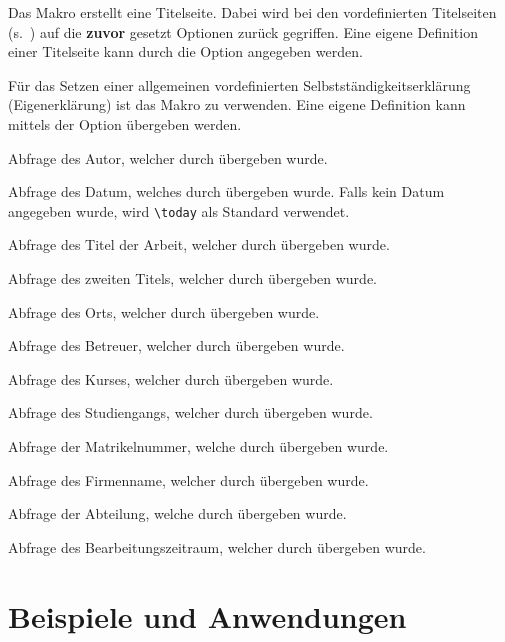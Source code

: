 \documentclass[babel=ngerman,highlight=false]{skdoc}
\begin{document}
            \DescribeMacro\dhbwtitlepage Das Makro erstellt eine Titelseite. Dabei wird bei den vordefinierten Titelseiten (s.~) auf die \textbf{zuvor} gesetzt Optionen zurück gegriffen. Eine eigene Definition einer Titelseite kann durch die Option  angegeben werden.

            \DescribeMacro\dhbwdeclaration Für das Setzen einer allgemeinen vordefinierten Selbstständigkeitserklärung (Eigenerklärung) ist das Makro zu verwenden. Eine eigene Definition kann mittels der Option  übergeben werden.

            \DescribeMacro\getAuthor Abfrage des Autor, welcher durch  übergeben wurde.

            \DescribeMacro\getDate Abfrage des Datum, welches durch  übergeben wurde. Falls kein Datum angegeben wurde, wird \verb|\today| als Standard verwendet.

            \DescribeMacro\getThesisTitle Abfrage des Titel der Arbeit, welcher durch  übergeben wurde.

            \DescribeMacro\getThesisSecondTitle Abfrage des zweiten Titels, welcher durch  übergeben wurde.

            \DescribeMacro\getLocation Abfrage des Orts, welcher durch  übergeben wurde.

            \DescribeMacro\getSupervisor Abfrage des Betreuer, welcher durch  übergeben wurde.

            \DescribeMacro\getCourseId Abfrage des Kurses, welcher durch  übergeben wurde.

            \DescribeMacro\getCourseName Abfrage des Studiengangs, welcher durch  übergeben wurde.

            \DescribeMacro\getStudentId Abfrage der Matrikelnummer, welche durch  übergeben wurde.

            \DescribeMacro\getInstitute Abfrage des Firmenname, welcher durch  übergeben wurde.

            \DescribeMacro\getInstituteSection Abfrage der Abteilung, welche durch  übergeben wurde.

            \DescribeMacro\getProcessingPeriod Abfrage des Bearbeitungszeitraum, welcher durch  übergeben wurde.

    \section{Beispiele und Anwendungen}
\end{document}

